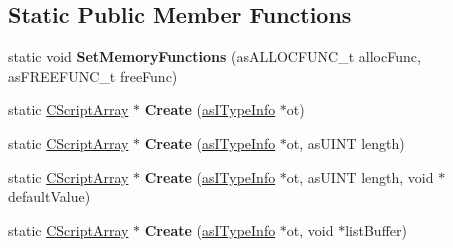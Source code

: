 \subsection*{Static Public Member Functions}
\begin{DoxyCompactItemize}
\item 
\mbox{\label{class_c_script_array_a04daa9f9f1234fc48adacc5369df736d}} 
static void {\bfseries Set\+Memory\+Functions} (as\+A\+L\+L\+O\+C\+F\+U\+N\+C\+\_\+t alloc\+Func, as\+F\+R\+E\+E\+F\+U\+N\+C\+\_\+t free\+Func)
\item 
\mbox{\label{class_c_script_array_a64ed669277c5069790175d49e29362c2}} 
static \hyperlink{class_c_script_array}{C\+Script\+Array} $\ast$ {\bfseries Create} (\hyperlink{classas_i_type_info}{as\+I\+Type\+Info} $\ast$ot)
\item 
\mbox{\label{class_c_script_array_a257441650a704b9483c2c5d7a554459f}} 
static \hyperlink{class_c_script_array}{C\+Script\+Array} $\ast$ {\bfseries Create} (\hyperlink{classas_i_type_info}{as\+I\+Type\+Info} $\ast$ot, as\+U\+I\+NT length)
\item 
\mbox{\label{class_c_script_array_a33d70a59a585eccc6c3630be62675960}} 
static \hyperlink{class_c_script_array}{C\+Script\+Array} $\ast$ {\bfseries Create} (\hyperlink{classas_i_type_info}{as\+I\+Type\+Info} $\ast$ot, as\+U\+I\+NT length, void $\ast$default\+Value)
\item 
\mbox{\label{class_c_script_array_a868e06f7f0b54b8f5ee8b3c68366d5af}} 
static \hyperlink{class_c_script_array}{C\+Script\+Array} $\ast$ {\bfseries Create} (\hyperlink{classas_i_type_info}{as\+I\+Type\+Info} $\ast$ot, void $\ast$list\+Buffer)
\end{DoxyCompactItemize}
